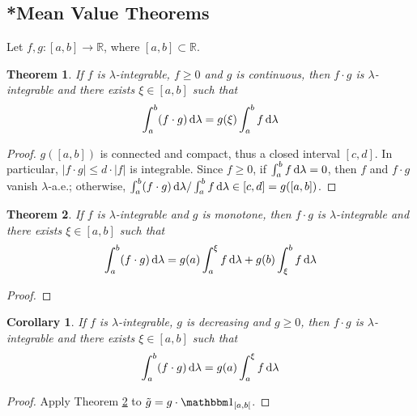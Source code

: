 \documentclass[11pt, a4paper, openany]{book}
\newtheorem{thm}{Theorem}\newtheorem{lem}{Lemma}\newtheorem{crl}{Corollary}
\theoremstyle{definition}
\begin{document}
\subsection{*Mean Value Theorems}
    Let $f,g:[a,b]\rightarrow \mathbb{R}$, where $[a,b]\subset\mathbb{R}$.
    \begin{thm}
        If $f$ is $\lambda$-integrable, $f\geqslant 0$ and $g$ is continuous, then $f\cdot g$ is $\lambda$-integrable and there exists $\xi\in [a,b]$ such that
        \[
            \int _a^b(f\cdot g)\odif\lambda = g(\xi)\int _a^bf\odif\lambda
        \]
    \end{thm}
    \begin{proof}
        $g([a,b])$ is connected and compact, thus a closed interval $[c,d]$. In particular, $|f\cdot g|\leqslant d\cdot |f|$ is integrable. Since $f\geqslant 0$, if $\int _a^bf\odif\lambda=0$, then $f$ and $f\cdot g$ vanish $\lambda$-a.e.; otherwise, $\int _a^b(f\cdot g)\odif\lambda/\int _a^bf\odif\lambda \in [c, d]=g([a,b])$.
    \end{proof}
    \begin{thm}\label{Bonnet's second mean value theorem}
        If $f$ is $\lambda$-integrable and $g$ is monotone, then $f\cdot g$ is $\lambda$-integrable and there exists $\xi\in[a,b]$ such that
        \[
            \int _a^b(f\cdot g)\odif\lambda = g(a)\int _a^\xi f\odif\lambda+g(b)\int_\xi^b f\odif\lambda
        \]
    \end{thm}
    \begin{proof}
        
    \end{proof}
    \begin{crl}
        If $f$ is $\lambda$-integrable, $g$ is decreasing and $g\geqslant 0$, then $f\cdot g$ is $\lambda$-integrable and there exists $\xi\in[a,b]$ such that
        \[
            \int _a^b(f\cdot g)\odif\lambda = g(a)\int _a^\xi f\odif\lambda
        \]
    \end{crl}
    \begin{proof}
        Apply Theorem \ref{Bonnet's second mean value theorem} to $\tilde{g}=g\cdot\one_{[a,b[}$.
    \end{proof}
\end{document}
